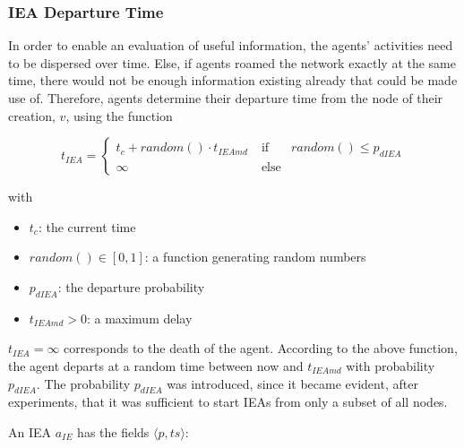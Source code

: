 
\subsubsection{IEA Departure Time}\label{sec_idt}

In order to enable an evaluation of useful information, the agents' activities need to be dispersed over time. Else, if agents roamed the network exactly at the same time, there would not be enough information existing already that could be made use of. Therefore, agents determine their departure time from the node of their creation, $v$, using the function



	\begin{equation}\label{tiea}
			t_{IEA}= \left\{ \begin{array}{rll}
			t_{c} + random() \cdot t_{IEAmd} & \; \mbox{if} \; & random() \leq p_{dIEA}\\
			\infty 	& \; \mbox{else}
	 			\end{array}\right.
		\end{equation}


with

\begin{itemize}

\item $t_{c}$: the current time

\item $random()\in [0,1]$: a function generating random numbers

\item $p_{dIEA}$: the departure probability

\item $t_{IEAmd}>0$: a maximum delay

\end{itemize}

$t_{IEA}=\infty$ corresponds to the death of the agent. According to the above function, the agent departs at a random time between now and $t_{IEAmd}$ with probability $p_{dIEA}$. The probability $p_{dIEA}$ was introduced, since it became evident, after experiments, that it was sufficient to start IEAs from only a subset of all nodes.

An IEA $a_{IE}$ has the fields $\langle p, ts \rangle$:

